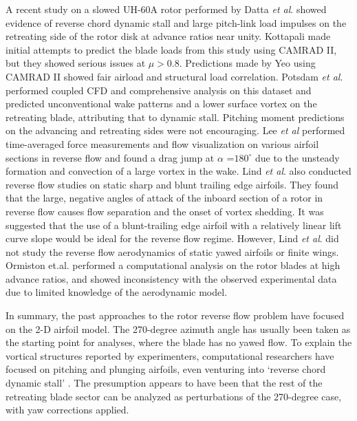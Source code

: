 \documentclass[%
 reprint,
 showkeys,
 amsmath,amssymb,
 aps,
]{revtex4-1}
\begin{document}
A recent study on a slowed UH-60A rotor performed by Datta \textit{et al}. \cite{6DattaJAHS-2013, potsdam2016computational, norman2011full, floros2009performance, berry2012performance} showed evidence of reverse chord dynamic stall and large pitch-link load impulses on the retreating side of the rotor disk at advance ratios near unity. Kottapali \cite{35Kottapalli-2012, kottapalli2011enhanced} made initial attempts to predict the blade loads from this study using CAMRAD II, but they showed serious issues at $\mu > 0.8 $. Predictions made by Yeo \cite{36YeoJA-2012} using CAMRAD II showed fair airload and structural load correlation. Potsdam \textit{et al}. \cite{20PostdamAHS-2012, ortun2016rotor} performed coupled CFD and comprehensive analysis on this dataset and predicted unconventional wake patterns and a lower surface vortex on the retreating blade, attributing that to dynamic stall. Pitching moment predictions on the advancing and retreating sides were not encouraging. Lee \textit{et al} \cite{park1994numerical} performed time-averaged force measurements and flow visualization on various airfoil sections in reverse flow and found a drag jump at $\alpha$ =$180^\circ$ due to the unsteady formation and convection of a large vortex in the wake. Lind \textit{et al}. \cite{7LindAIAA-2013, lind2015experimental, lind2016unsteady, lind2016reynolds, lind2015reynolds} also conducted reverse flow studies on static sharp and blunt trailing edge airfoils. They found that the large, negative angles of attack of the inboard section of a rotor in reverse flow causes flow separation and the onset of vortex shedding. It was suggested that the use of a blunt-trailing edge airfoil with a relatively linear lift curve slope would be ideal for the reverse flow regime. However, Lind \textit{et al}. did not study the reverse flow aerodynamics of static yawed airfoils or finite wings. Ormiston et.al. \cite{ormiston2008new, ormiston2012rotor, ormiston2009analytical} performed a computational analysis on the rotor blades at high advance ratios, and showed inconsistency with the observed experimental data due to limited knowledge of the aerodynamic model. 

In summary, the past approaches to the rotor reverse flow problem have focused on the 2-D airfoil model. The 270-degree azimuth angle has usually been taken as the starting point for analyses, where the blade has no yawed flow. To explain the vortical structures reported by experimenters, computational researchers have focused on pitching and plunging airfoils, even venturing into `reverse chord dynamic stall’ \cite{berry2014slowed,berry2011wind,berry2013high,bowen2014validation}. The presumption appears to have been that the rest of the retreating blade sector can be analyzed as perturbations of the 270-degree case, with yaw corrections applied.
\end{document}
